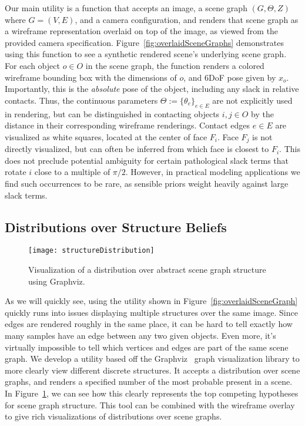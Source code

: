 Our main utility is a function that accepts an image, a scene graph $(G, \Theta, Z)$ where $G = (V,E)$, and a camera configuration, and renders that scene graph as a wireframe representation overlaid on top of the image, as viewed from the provided camera specification.
Figure~\ref{fig:overlaidSceneGraphs} demonstrates using this function to see a synthetic rendered scene's underlying scene graph.
For each object $o \in O$ in the scene graph, the function renders a colored wireframe bounding box with the dimensions of $o$, and 6DoF pose given by $x_o$.
Importantly, this is the \textit{absolute} pose of the object, including any slack in relative contacts.
Thus, the continuous parameters $\Theta := \{\theta_e\}_{e \in E}$ are not explicitly used in rendering, but can be distinguished in contacting objects $i,j \in O$ by the distance in their corresponding wireframe renderings.
Contact edges $e \in E$ are visualized as white squares, located at the center of face $F_i$.
Face $F_j$ is not directly visualized, but can often be inferred from which face is closest to $F_i$.
This does not preclude potential ambiguity for certain pathological slack terms that rotate $i$ close to a multiple of $\pi/2$.
However, in practical modeling applications we find such occurrences to be rare, as sensible priors weight heavily against large slack terms.

\subsection{Distributions over Structure Beliefs}

\begin{figure}[t]
  \centering
  \texttt{[image: structureDistribution]}
  \caption{
    Visualization of a distribution over abstract scene graph structure using Graphviz.
  }
  \label{fig:structureDistribution}
\end{figure}

As we will quickly see, using the utility shown in Figure~\ref{fig:overlaidSceneGraph} quickly runs into issues displaying multiple structures over the same image.
Since edges are rendered roughly in the same place, it can be hard to tell exactly how many samples have an edge between any two given objects.
Even more, it's virtually impossible to tell which vertices and edges are part of the same scene graph.
We develop a utility based off the Graphviz~\cite{Ellson03graphvizand} graph visualization library to more clearly view different discrete structures.
It accepts a distribution over scene graphs, and renders a specified number of the most probable present in a scene.
In Figure~\ref{fig:structureDistribution}, we can see how this clearly represents the top competing hypotheses for scene graph structure.
This tool can be combined with the wireframe overlay to give rich visualizations of distributions over scene graphs.

